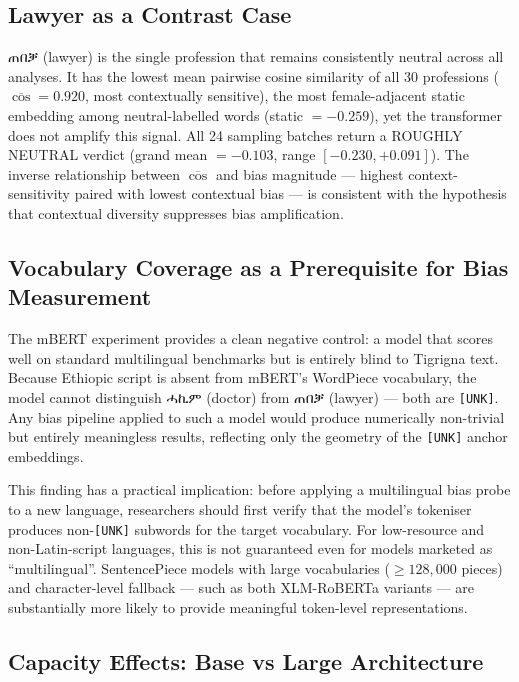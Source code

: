 \documentclass[11pt,a4paper]{article}
\newcommand{\ti}[1]{{\ethiopicfont #1}}
\begin{document}
\subsection{Lawyer as a Contrast Case}

{\ethiopicfont ጠበቓ} (lawyer) is the single profession that remains consistently neutral
across all analyses. It has the lowest mean pairwise cosine similarity of all
30 professions ($\overline{\cos} = 0.920$, most contextually sensitive), the
most female-adjacent static embedding among neutral-labelled words (static
$= -0.259$), yet the transformer does not amplify this signal. All 24 sampling
batches return a ROUGHLY NEUTRAL verdict (grand mean $= -0.103$, range
$[-0.230, +0.091]$). The inverse relationship between $\overline{\cos}$ and
bias magnitude — highest context-sensitivity paired with lowest contextual bias
— is consistent with the hypothesis that contextual diversity suppresses bias
amplification.

\subsection{Vocabulary Coverage as a Prerequisite for Bias Measurement}

The mBERT experiment provides a clean negative control: a model that scores well
on standard multilingual benchmarks but is entirely blind to Tigrigna text.
Because Ethiopic script is absent from mBERT's WordPiece vocabulary, the model
cannot distinguish \ti{ሓኪም} (doctor) from \ti{ጠበቓ} (lawyer) — both are
\texttt{[UNK]}. Any bias pipeline applied to such a model would produce
numerically non-trivial but entirely meaningless results, reflecting only the
geometry of the \texttt{[UNK]} anchor embeddings.

This finding has a practical implication: before applying a multilingual bias
probe to a new language, researchers should first verify that the model's
tokeniser produces non-\texttt{[UNK]} subwords for the target vocabulary.
For low-resource and non-Latin-script languages, this is not guaranteed even
for models marketed as ``multilingual''. SentencePiece models with large
vocabularies ($\geq 128{,}000$ pieces) and character-level fallback — such as
both XLM-RoBERTa variants — are substantially more likely to provide meaningful
token-level representations.

\subsection{Capacity Effects: Base vs Large Architecture}
\end{document}
